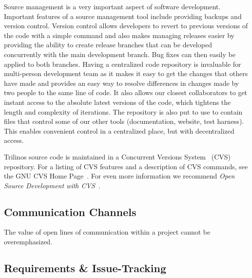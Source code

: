 \documentclass[12pt,relax]{article}
\begin{document}

Source management is a very important aspect of software development. 
Important features of a source management tool include providing backups and
version control.  Version control allows developers to revert to previous
versions of the code with a simple command and also makes managing releases
easier by providing the ability to create release branches that can be
developed concurrently with the main development branch.  Bug fixes can then
easily be applied to both branches.  Having a centralized code repository is
invaluable for multi-person development team as it makes it easy to get the
changes that others have made and provides an easy way to resolve differences
in changes made by two people to the same line of code.  It also allows our
closest collaborators to get instant access to the absolute latest versions
of the code, which tightens the length and complexity of iterations.  The
repository is also put to use to contain files that control some of our other
tools (documentation, website, test harness).  This enables convenient control
in a centralized place, but with decentralized access.

Trilinos source code is maintained in a Concurrent Versions System~\cite{CVS}
(CVS) repository.  For a listing of CVS features and a description of 
CVS commands, see the GNU CVS Home Page~\cite{CVS}.  For even more information
we recommend {\it Open Source Development with CVS}~\cite{FogelBarCVS}.

\subsection{Communication Channels}


The value of open lines of communication within a project cannot be 
overemphasized.   

\subsection{Requirements \& Issue-Tracking}

\end{document}
